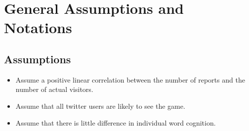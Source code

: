 \documentclass{mcmthesis}
\begin{document}

%


\section{General Assumptions and Notations}

\subsection{Assumptions}
\begin{itemize}
	\item Assume a positive linear correlation between the number of reports and the number of actual visitors.
	\item Assume that all twitter users are likely to see the game.
	\item Assume that there is little difference in individual word cognition.
\end{itemize}
\end{document}

